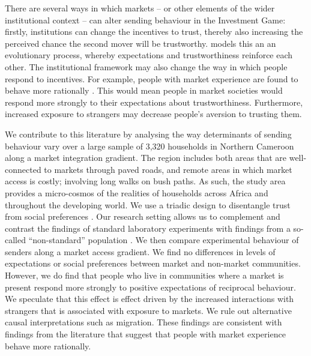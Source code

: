 There are several ways in which markets -- or other elements of the wider institutional context -- can alter sending behaviour in the Investment Game: firstly, institutions can change the incentives to trust, thereby also increasing the perceived chance the second mover will be trustworthy. \cite{Tabellini2008} models this an an evolutionary process, whereby expectations and trustworthiness reinforce each other. The institutional framework may also change the way in which people respond to incentives. For example, people with market experience are found to behave more rationally \citep{List2008,Cecchi2013,Braga2009}. This would mean people in market societies would respond more strongly to their expectations about trustworthiness. Furthermore, increased exposure to strangers may decrease people's aversion to trusting them.

We contribute to this literature by analysing the way determinants of sending behaviour vary over a large sample of 3,320 households in Northern Cameroon along a market integration gradient. The region includes both areas that are well-connected to markets through paved roads, and remote areas in which market access is costly; involving long walks on bush paths. As such, the study area provides a micro-cosmos of the realities of households across Africa and throughout the developing world.  We use a triadic design to disentangle trust from social preferences \cite[following][]{Cox2004,Ashraf2006}. Our research setting allows us to complement and contrast the findings of standard laboratory experiments with findings from a so-called “non-standard” population \citep{Henrich2010a}. We then compare experimental behaviour of senders along a market access gradient. We find no differences in levels of expectations or social preferences between market and non-market communities. However, we do find that people who live in communities where a market is present respond more strongly to positive expectations of reciprocal behaviour. We speculate that this effect is effect driven by the increased interactions with strangers that is associated with exposure to markets. We rule out alternative causal interpretations such as migration. These findings are consistent with findings from the literature that suggest that people with market experience behave more rationally.


